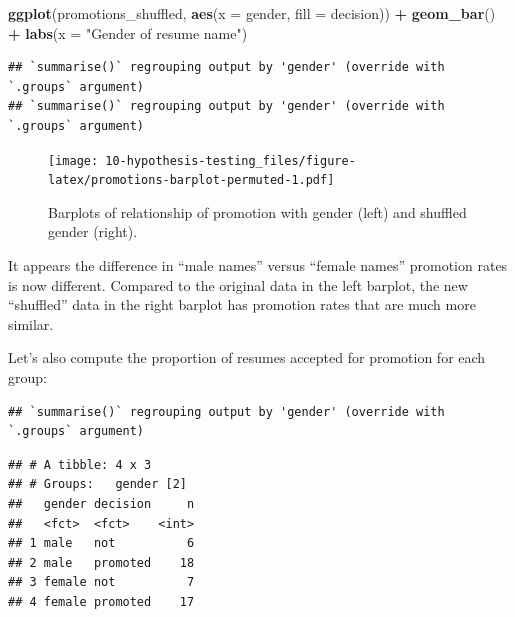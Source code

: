 \documentclass[
]{book}
\newenvironment{Shaded}{\begin{snugshade}}{\end{snugshade}}
\newcommand{\DataTypeTok}[1]{\textcolor[rgb]{0.13,0.29,0.53}{#1}}
\newcommand{\KeywordTok}[1]{\textcolor[rgb]{0.13,0.29,0.53}{\textbf{#1}}}
\newcommand{\NormalTok}[1]{#1}
\newcommand{\OperatorTok}[1]{\textcolor[rgb]{0.81,0.36,0.00}{\textbf{#1}}}
\newcommand{\StringTok}[1]{\textcolor[rgb]{0.31,0.60,0.02}{#1}}
\begin{document}
\begin{Shaded}
\begin{Highlighting}[]
\KeywordTok{ggplot}\NormalTok{(promotions_shuffled, }\KeywordTok{aes}\NormalTok{(}\DataTypeTok{x =}\NormalTok{ gender, }\DataTypeTok{fill =}\NormalTok{ decision)) }\OperatorTok{+}
\StringTok{  }\KeywordTok{geom_bar}\NormalTok{() }\OperatorTok{+}
\StringTok{  }\KeywordTok{labs}\NormalTok{(}\DataTypeTok{x =} \StringTok{"Gender of resume name"}\NormalTok{)}
\end{Highlighting}
\end{Shaded}

\begin{verbatim}
## `summarise()` regrouping output by 'gender' (override with `.groups` argument)
## `summarise()` regrouping output by 'gender' (override with `.groups` argument)
\end{verbatim}

\begin{figure}
\centering
\texttt{[image: 10-hypothesis-testing\_files/figure-latex/promotions-barplot-permuted-1.pdf]}
\caption{\label{fig:promotions-barplot-permuted}Barplots of relationship of promotion with gender (left) and shuffled gender (right).}
\end{figure}

It appears the difference in ``male names'' versus ``female names'' promotion rates is now different. Compared to the original data in the left barplot, the new ``shuffled'' data in the right barplot has promotion rates that are much more similar.

Let's also compute the proportion of resumes accepted for promotion for each group:

\begin{Shaded}
\end{Shaded}

\begin{verbatim}
## `summarise()` regrouping output by 'gender' (override with `.groups` argument)
\end{verbatim}

\begin{verbatim}
## # A tibble: 4 x 3
## # Groups:   gender [2]
##   gender decision     n
##   <fct>  <fct>    <int>
## 1 male   not          6
## 2 male   promoted    18
## 3 female not          7
## 4 female promoted    17
\end{verbatim}
\end{document}
